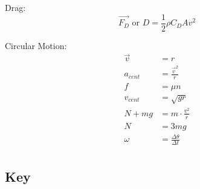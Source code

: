 \documentclass[12pt, letterpaper]{book}
\begin{document}
\begin{multicols}{2}
        Drag: 
        \begin{equation}
            \vec{F_D}\text{ or }D = \frac{1}{2}\rho C_{D}Av^{2}
        \end{equation}

        Circular Motion:
        \begin{align}
            \vec{v}     & = r                               \\
            a_{cent}    & =\frac{\vec{v}^{2}}{r}            \\
            f           & = \mu n                           \\
            v_{cent}    & = \sqrt{gr}                       \\
            N + mg      & = m\cdot \frac{v^2}{r}            \\
            N           & = 3mg                             \\
            \omega      & = \frac{\Delta \theta}{\Delta t}  \\
        \end{align}
    \end{multicols}

    \pagebreak

    \subsection*{Key}
\end{document}
